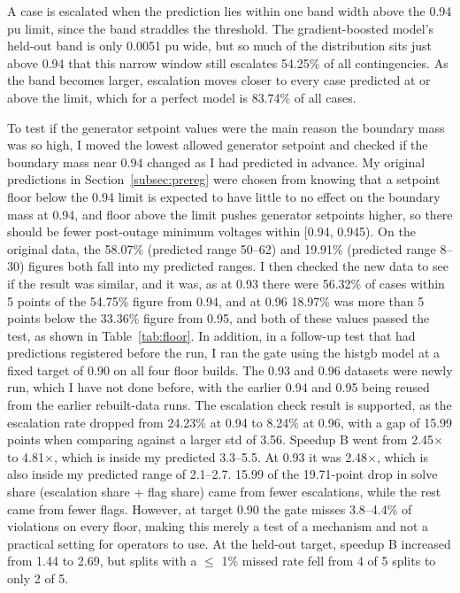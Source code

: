 \documentclass[12pt]{article}
\begin{document}
A case is escalated when the prediction lies within one band width above the 0.94 pu limit, since the band straddles the threshold. The gradient-boosted model's held-out band is only 0.0051 pu wide, but so much of the distribution sits just above 0.94 that this narrow window still escalates 54.25\% of all contingencies. As the band becomes larger, escalation moves closer to every case predicted at or above the limit, which for a perfect model is 83.74\% of all cases.

To test if the generator setpoint values were the main reason the boundary mass was so high, I moved the lowest allowed generator setpoint and checked if the boundary mass near 0.94 changed as I had predicted in advance. My original predictions in Section~\ref{subsec:prereg} were chosen from knowing that a setpoint floor below the 0.94 limit is expected to have little to no effect on the boundary mass at 0.94, and floor above the limit pushes generator setpoints higher, so there should be fewer post-outage minimum voltages within [0.94, 0.945). On the original data, the 58.07\% (predicted range 50--62) and 19.91\% (predicted range 8--30) figures both fall into my predicted ranges. I then checked the new data to see if the result was similar, and it was, as at 0.93 there were 56.32\% of cases within 5 points of the 54.75\% figure from 0.94, and at 0.96 18.97\% was more than 5 points below the 33.36\% figure from 0.95, and both of these values passed the test, as shown in Table~\ref{tab:floor}. In addition, in a follow-up test that had predictions registered before the run, I ran the gate using the histgb model at a fixed target of 0.90 on all four floor builds. The 0.93 and 0.96 datasets were newly run, which I have not done before, with the earlier 0.94 and 0.95 being reused from the earlier rebuilt-data runs. The escalation check result is supported, as the escalation rate dropped from 24.23\% at 0.94 to 8.24\% at 0.96, with a gap of 15.99 points when comparing against a larger std of 3.56. Speedup B went from 2.45$\times$ to 4.81$\times$, which is inside my predicted 3.3--5.5. At 0.93 it was 2.48$\times$, which is also inside my predicted range of 2.1--2.7. 15.99 of the 19.71-point drop in solve share (escalation share + flag share) came from fewer escalations, while the rest came from fewer flags. However, at target 0.90 the gate misses 3.8--4.4\% of violations on every floor, making this merely a test of a mechanism and not a practical setting for operators to use. At the held-out target, speedup B increased from 1.44 to 2.69, but splits with a $\leq$ 1\% missed rate fell from 4 of 5 splits to only 2 of 5.
\end{document}
